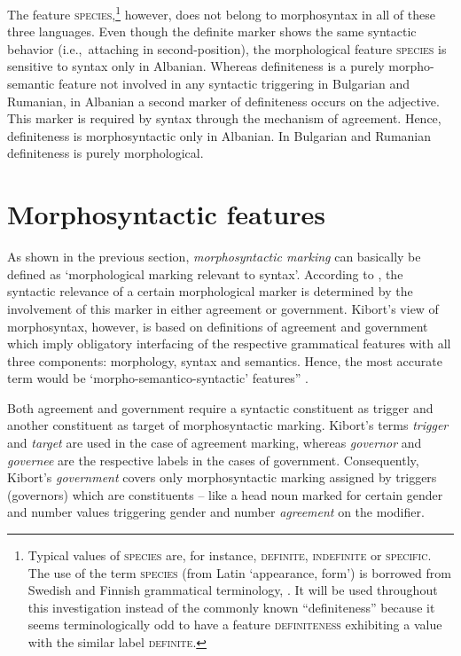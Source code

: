 The feature \textsc{species},\footnote{Typical values of \textsc{species} are, for instance, \textsc{definite, indefinite} or \textsc{specific}. The use of the term \textsc{species} (from Latin ‘appearance, form’) is borrowed from Swedish and Finnish grammatical terminology, \cite[cf., e.g.,][]{holm-etal1970,itkonen-t1980a}. It will be used throughout this investigation instead of the commonly known “definiteness” because it seems terminologically odd to have a feature \textsc{definiteness} exhibiting a value with the similar label \textsc{definite}.} however, does not belong to morphosyntax in all of these three languages. Even though the definite marker shows the same syntactic behavior (i.e.,~attaching in second-position), the morphological feature \textsc{species} is sensitive to syntax only in Albanian. Whereas definiteness is a purely morpho-semantic feature not involved in any syntactic triggering in Bulgarian and Rumanian, in Albanian a second marker of definiteness occurs on the adjective. This marker is required by syntax through the mechanism of agreement. Hence, definiteness is morphosyntactic only in Albanian. In Bulgarian and Rumanian definiteness is purely morphological.

\section{Morphosyntactic features} \label{crit eval}
As shown in the previous section, \emph{morphosyntactic marking} can basically be defined as ‘morphological marking relevant to syntax’. According to \cite{kibort2010a}, the syntactic relevance of a certain morphological marker is determined by the involvement of this marker in either agreement or government. Kibort's view of morphosyntax, however, is based on definitions of agreement and government which imply obligatory interfacing of the respective grammatical features with all three components: morphology, syntax and semantics. Hence, the most accurate term would be ‘morpho-semantico-syntactic’ features” \citep[cf.]{kibort2010a}.

Both agreement and government require a syntactic constituent as trigger and another constituent as target of morphosyntactic marking. Kibort's terms \emph{trigger} and \emph{target} are used in the case of agreement marking, whereas \emph{governor} and \emph{governee} are the respective labels in the cases of government. Consequently, Kibort's \emph{government} covers only morphosyntactic marking assigned by triggers (governors) which are constituents – like a head noun marked for certain gender and number values triggering gender and number \emph{agreement} on the modifier.

